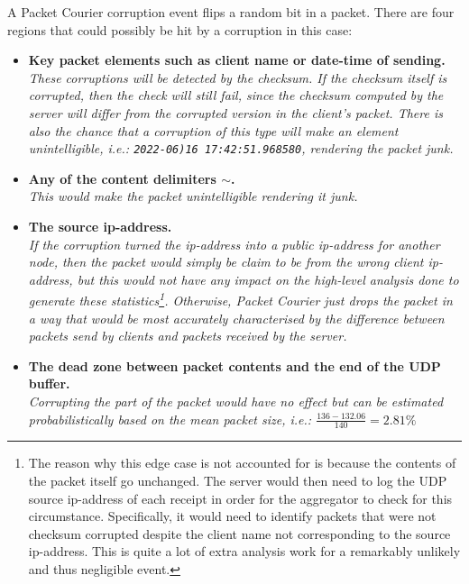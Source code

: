 A Packet Courier corruption event flips a random bit in a packet. There are four regions that could possibly be hit
by a corruption in this case:
\begin{itemize}
    \item \textbf{Key packet elements such as client name or date-time of sending.} \\
    \emph{These corruptions will be detected by the checksum. If the checksum itself is corrupted, then the check
    will still fail, since the checksum computed by the server will differ from the corrupted version in the client's
    packet. There is also the chance that a corruption of this type will make an element unintelligible, i.e.:
    \texttt{2022-06)16 17:42:51.968580}, rendering the packet junk.}
    \item \textbf{Any of the content delimiters \texttt{$\sim$}.} \\
    \emph{This would make the packet unintelligible rendering it junk.}
    \item \textbf{The source ip-address.} \\
    \emph{If the corruption turned the ip-address into a public ip-address for another node, then the packet would
    simply be claim to be from the wrong client ip-address, but this would not have any impact on the high-level
    analysis done to generate these statistics\footnote{The reason why this edge case is not accounted for is because
    the contents of the packet itself go unchanged. The server would then need to log the UDP source ip-address of
    each receipt in order for the aggregator to check for this circumstance. Specifically, it would need to identify
    packets that were not checksum corrupted despite the client name not corresponding to the source ip-address. This
    is quite a lot of extra analysis work for a remarkably unlikely and thus negligible event.}. Otherwise, Packet
    Courier just drops the packet in a way that would be most accurately characterised by the difference between
    packets send by clients and packets received by the server.}
    \item \textbf{The dead zone between packet contents and the end of the UDP buffer.} \\
    \emph{Corrupting the part of the packet would have no effect but can be estimated probabilistically based on the
    mean packet size, i.e.: $\frac{136 - 132.06}{140} = 2.81\%$}
\end{itemize}

